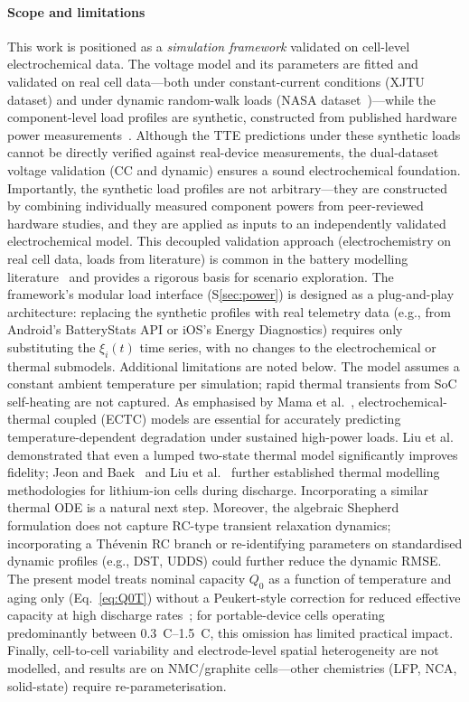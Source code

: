 \documentclass[5p,times,number]{elsarticle}
\newcommand{\ssref}[1]{\hyperref[#1]{\textup{\S\ref*{#1}}}}
\newcommand{\eqnrefp}[1]{\hyperref[#1]{\textup{Eq.~\ref*{#1}}}}
\def\ssref#1{S\ref{#1}}
\def\eqnrefp#1{Eq.~\ref{#1}}
\begin{document}
\paragraph{Scope and limitations}
This work is positioned as a \emph{simulation framework} validated on cell-level electrochemical data.
The voltage model and its parameters are fitted and validated on real cell data---both under constant-current conditions (XJTU dataset) and under dynamic random-walk loads (NASA dataset~\cite{Bole2014})---while the component-level load profiles are synthetic, constructed from published hardware power measurements~\cite{Carroll2010,Chen2014,Lu2008}.
Although the TTE predictions under these synthetic loads cannot be directly verified against real-device measurements, the dual-dataset voltage validation (CC and dynamic) ensures a sound electrochemical foundation.
Importantly, the synthetic load profiles are not arbitrary---they are constructed by combining individually measured component powers from peer-reviewed hardware studies, and they are applied as inputs to an independently validated electrochemical model.
This decoupled validation approach (electrochemistry on real cell data, loads from literature) is common in the battery modelling literature~\cite{Fuller2014,Mama2025} and provides a rigorous basis for scenario exploration.
The framework's modular load interface (\ssref{sec:power}) is designed as a plug-and-play architecture: replacing the synthetic profiles with real telemetry data (e.g., from Android's BatteryStats API or iOS's Energy Diagnostics) requires only substituting the $\xi_i(t)$ time series, with no changes to the electrochemical or thermal submodels.
Additional limitations are noted below.
The model assumes a constant ambient temperature per simulation; rapid thermal transients from SoC self-heating are not captured.
As emphasised by Mama et al.~\cite{Mama2025}, electrochemical-thermal coupled (ECTC) models are essential for accurately predicting temperature-dependent degradation under sustained high-power loads.
Liu et al.~\cite{Liu2019ECM} demonstrated that even a lumped two-state thermal model significantly improves fidelity; Jeon and Baek~\cite{Jeon2011ECM} and Liu et al.~\cite{Liu2017ECM} further established thermal modelling methodologies for lithium-ion cells during discharge. Incorporating a similar thermal ODE is a natural next step.
Moreover, the algebraic Shepherd formulation does not capture RC-type transient relaxation dynamics; incorporating a Th\'{e}venin RC branch or re-identifying parameters on standardised dynamic profiles (e.g., DST, UDDS) could further reduce the dynamic RMSE.
The present model treats nominal capacity $Q_0$ as a function of temperature and aging only (\eqnrefp{eq:Q0T}) without a Peukert-style correction for reduced effective capacity at high discharge rates~\cite{Fuller2014}; for portable-device cells operating predominantly between \SIrange{0.3}{1.5}{C}, this omission has limited practical impact.
Finally, cell-to-cell variability and electrode-level spatial heterogeneity are not modelled, and results are on NMC/graphite cells---other chemistries (LFP, NCA, solid-state) require re-parameterisation.
\end{document}
